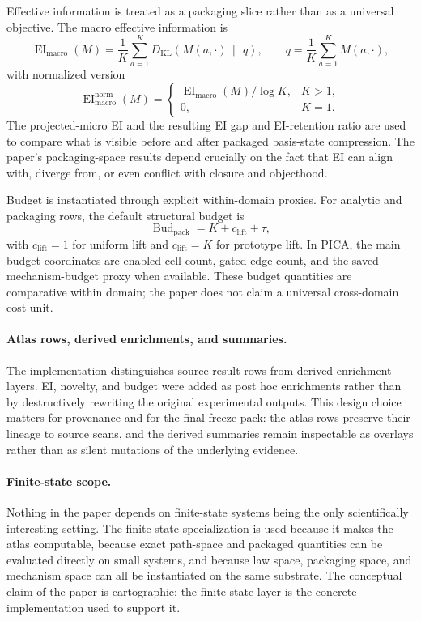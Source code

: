 \documentclass[11pt]{article}
\theoremstyle{definition}
\begin{document}
Effective information is treated as a packaging slice rather than as a universal objective. The macro effective information is
\[
\operatorname{EI}_{\mathrm{macro}}(M)
=
\frac{1}{K}
\sum_{a=1}^{K}
D_{\mathrm{KL}}\!\left(
M(a,\cdot)\,\middle\|\,q
\right),
\qquad
q=\frac{1}{K}\sum_{a=1}^{K}M(a,\cdot),
\]
with normalized version
\[
\operatorname{EI}_{\mathrm{macro}}^{\mathrm{norm}}(M)
=
\begin{cases}
\operatorname{EI}_{\mathrm{macro}}(M)/\log K, & K>1,\\
0, & K=1.
\end{cases}
\]
The projected-micro EI and the resulting EI gap and EI-retention ratio are used to compare what is visible before and after packaged basis-state compression. The paper's packaging-space results depend crucially on the fact that EI can align with, diverge from, or even conflict with closure and objecthood.

Budget is instantiated through explicit within-domain proxies. For analytic and packaging rows, the default structural budget is
\[
\operatorname{Bud}_{\mathrm{pack}}
=
K + c_{\mathrm{lift}} + \tau,
\]
with $c_{\mathrm{lift}}=1$ for uniform lift and $c_{\mathrm{lift}}=K$ for prototype lift. In PICA, the main budget coordinates are enabled-cell count, gated-edge count, and the saved mechanism-budget proxy when available. These budget quantities are comparative within domain; the paper does not claim a universal cross-domain cost unit.

\paragraph{Atlas rows, derived enrichments, and summaries.}
The implementation distinguishes source result rows from derived enrichment layers. EI, novelty, and budget were added as post hoc enrichments rather than by destructively rewriting the original experimental outputs. This design choice matters for provenance and for the final freeze pack: the atlas rows preserve their lineage to source scans, and the derived summaries remain inspectable as overlays rather than as silent mutations of the underlying evidence.

\paragraph{Finite-state scope.}
Nothing in the paper depends on finite-state systems being the only scientifically interesting setting. The finite-state specialization is used because it makes the atlas computable, because exact path-space and packaged quantities can be evaluated directly on small systems, and because law space, packaging space, and mechanism space can all be instantiated on the same substrate. The conceptual claim of the paper is cartographic; the finite-state layer is the concrete implementation used to support it.
\end{document}
